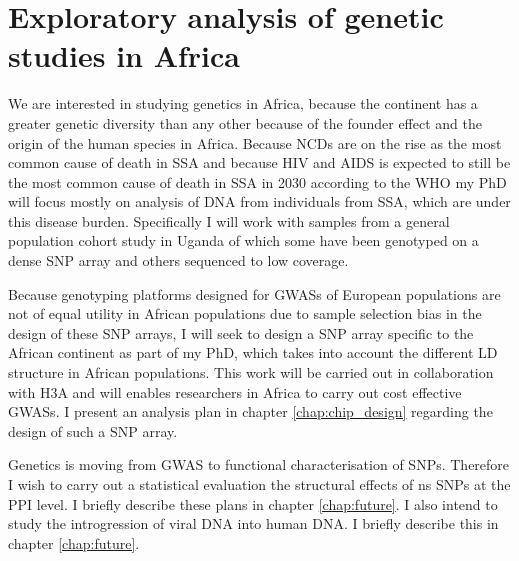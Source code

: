 \section{Exploratory analysis of genetic studies in Africa}

We are interested in studying genetics in Africa, because the continent has a greater genetic diversity than any other because of the founder effect and the origin of the human species in Africa\cite{1000G2012}\cite{Gurdasani2015}\cite{Tishkoff22052009}\cite{Stringer2003}. Because \glspl{NCD} are on the rise as the most common cause of death in \gls{SSA} and because \gls{HIV} and \gls{AIDS} is expected to still be the most common cause of death in \gls{SSA} in 2030 according to the \gls{WHO}\cite{10.1371/journal.pmed.0030442} %
my PhD will focus mostly on analysis of DNA from individuals from \gls{SSA}, which are under this disease burden. Specifically I will work with samples from a general population cohort study in Uganda\cite{Asiki01022013} of which some have been genotyped on a dense SNP array and others sequenced to low coverage.

Because genotyping platforms designed for \glspl{GWAS} of European populations are not of equal utility in African populations due to sample selection bias in the design of these \gls{SNP} arrays, I will seek to design a \gls{SNP} array specific to the African continent as part of my PhD, which takes into account the different \gls{LD} structure in African populations. This work will be carried out in collaboration with \acrfull{H3A} and will enables researchers in Africa to carry out cost effective \glspl{GWAS}. I present an analysis plan in chapter \ref{chap:chip_design} regarding the design of such a \gls{SNP} array.

Genetics is moving from \gls{GWAS} to functional characterisation of \glspl{SNP}. Therefore I wish to carry out a statistical evaluation the structural effects of \gls{ns} \glspl{SNP} at the \gls{PPI} level. I briefly describe these plans in chapter \ref{chap:future}. I also intend to study the introgression of viral DNA into human DNA. I briefly describe this in chapter \ref{chap:future}.